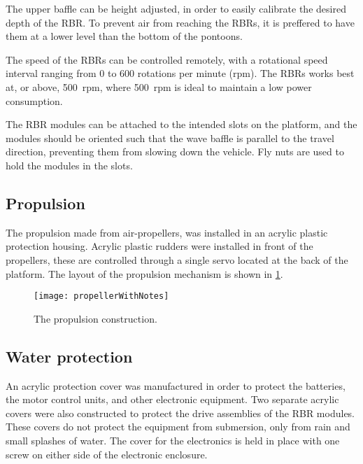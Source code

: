The upper baffle can be height adjusted, in order to easily calibrate the desired depth of the RBR. To prevent air from reaching the RBRs, it is preffered to have them at a lower level than the bottom of the pontoons.


The speed of the RBRs can be controlled remotely, with a rotational speed interval ranging from 0 to 600 rotations per minute (rpm). The RBRs works best at, or above, 500~rpm, where 500~rpm is ideal to maintain a low power consumption.


The RBR modules can be attached to the intended slots on the platform, and the modules should be oriented such that the wave baffle is parallel to the travel direction, preventing them from slowing down the vehicle. Fly nuts are used to hold the modules in the slots. 

\subsection{Propulsion}
The propulsion made from air-propellers, was installed in an acrylic plastic protection housing. Acrylic plastic rudders were installed in front of the propellers, these are controlled through a single servo located at the back of the platform. The layout of the propulsion mechanism is shown in \cref{fig:propellerWithNotes}.

\begin{figure}[h]
   \centering
   \texttt{[image: propellerWithNotes]}
   \caption{The propulsion construction.}
   \label{fig:propellerWithNotes}
\end{figure}

\subsection{Water protection}

An acrylic protection cover was manufactured in order to protect the batteries, the motor control units, and other electronic equipment. Two separate acrylic covers were also constructed to protect the drive assemblies of the RBR modules. These covers do not protect the equipment from submersion, only from rain and small splashes of water. %
The cover for the electronics is held in place with one screw on either side of the electronic enclosure.

